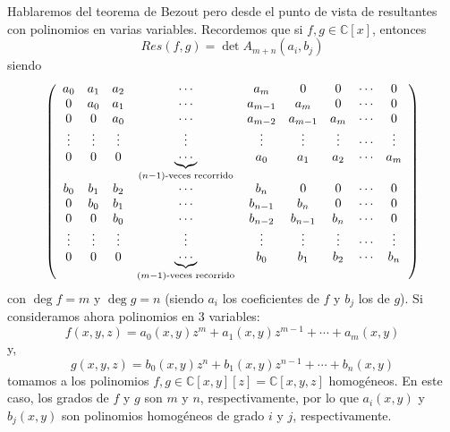 \documentclass[12pt]{report}
\theoremstyle{largebreak}
\begin{document}
    Hablaremos del teorema de Bezout pero desde el punto de vista de resultantes con polinomios en varias variables. Recordemos que si $f,g\in\mathbb{C}[x]$, entonces
    \begin{equation*}
        Res(f,g)=\det A_{ m+n}(a_i,b_j)
    \end{equation*}
    siendo
    \begin{equation*}
        \left(
            \begin{array}{cccccccccc}
                a_0 & a_1 & a_2 & \cdots & a_m & 0 & 0 & \cdots & 0 \\
                0 & a_0 & a_1 &  \cdots & a_{ m-1} & a_m & 0 & \cdots & 0 \\
                0 & 0 & a_0 & \cdots & a_{ m-2} & a_{ m-1} & a_m & \cdots & 0 \\
                \vdots & \vdots & \vdots & \vdots  & \vdots & \vdots & \vdots & \cdots & \vdots \\
                0 & 0 & 0 &  \underset{(n-1)\textup{-veces recorrido}}{\underbrace{\cdots}} & a_0 & a_1 & a_2 & \cdots & a_m \\
                b_0 & b_1 & b_2 & \cdots & b_n & 0 & 0 & \cdots & 0 \\
                0 & b_0 & b_1 &  \cdots & b_{ n-1} & b_n & 0 & \cdots & 0 \\
                0 & 0 & b_0 & \cdots & b_{ n-2} & b_{ n-1} & b_n& \cdots & 0 \\
                \vdots & \vdots & \vdots & \vdots  & \vdots & \vdots & \vdots & \cdots & \vdots \\
                0 & 0 & 0 &  \underset{(m-1)\textup{-veces recorrido}}{\underbrace{\cdots}} & b_0 & b_1 & b_2 & \cdots & b_n \\
            \end{array}
            \right)
    \end{equation*}
    con $\deg f=m$ y $\deg g = n$ (siendo $a_i$ los coeficientes de $f$ y $b_j$ los de $g$). Si consideramos ahora polinomios en 3 variables:
    \begin{equation*}
        f(x,y,z)=a_0(x,y)z^m+a_1(x,y)z^{ m-1}+\cdots+a_m(x,y)
    \end{equation*}
    y,
    \begin{equation*}
        g(x,y,z)=b_0(x,y)z^n+b_1(x,y)z^{ n-1}+\cdots+b_n(x,y)
    \end{equation*}
    tomamos a los polinomios $f,g\in\mathbb{C}[x,y][z]=\mathbb{C}[x,y,z]$ homogéneos. En este caso, los grados de $f$ y $g$ son $m$ y $n$, respectivamente, por lo que $a_i(x,y)$ y $b_j(x,y)$ son polinomios homogéneos de grado $i$ y $j$, respectivamente.
\end{document}
